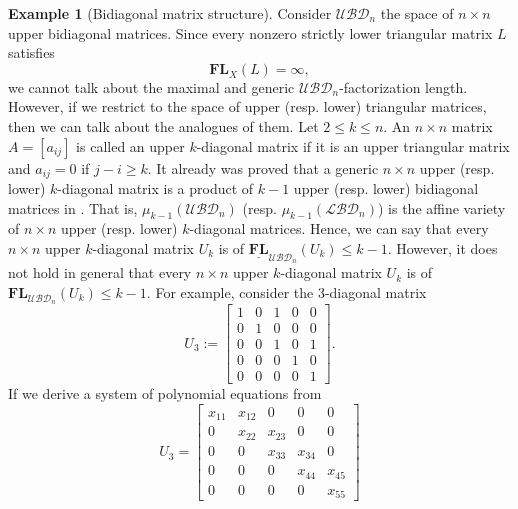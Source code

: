 \documentclass[reqno]{amsart}
\theoremstyle{definition}
\newtheorem{example}[theorem]{Example}
\numberwithin{equation}{section}
\begin{document}
\begin{example}[Bidiagonal matrix structure]\label{ex:bidiagonal}
    Consider $\mathcal{UBD}_n$ the space of $n \times n$ upper bidiagonal matrices. Since every nonzero strictly lower triangular matrix $L$ satisfies
    \begin{equation*}
        \mathbf{FL}_X(L)=\infty,
    \end{equation*}
    we cannot talk about the maximal and generic $\mathcal{UBD}_n$-factorization length. However, if we restrict to the space of upper (resp. lower) triangular matrices, then we can talk about the analogues of them. Let $2 \leq k \leq n$. An $n \times n$ matrix $A=[a_{ij}]$ is called an upper  $k$-diagonal matrix if it is an upper triangular matrix and $a_{ij}=0$ if $j-i\geq k$.
    It already was proved that a generic $n \times n$ upper (resp. lower) $k$-diagonal matrix is a product of $k-1$ upper (resp. lower) bidiagonal matrices in \cite[Lemma 5.1]{ye2017new}. That is, $\mu_{k-1}(\mathcal{UBD}_n)$ (resp. $\mu_{k-1}(\mathcal{LBD}_n)$) is the affine variety of $n \times n$ upper (resp. lower) $k$-diagonal matrices. Hence, we can say that every $n \times n$ upper $k$-diagonal matrix $U_k$ is of $\underline{\mathbf{FL}}_{\mathcal{UBD}_n}(U_k) \leq k-1$. However, it does not hold in general that every $n \times n$ upper $k$-diagonal matrix $U_k$ is of $\mathbf{FL}_{\mathcal{UBD}_n}(U_k)\leq k-1$. For example, consider the $3$-diagonal matrix
    \begin{equation}\label{eq:example of upper triangular matrix}
        U_3:=\begin{bmatrix}
        1 & 0 & 1 & 0 & 0\\
        0 & 1 & 0 & 0 & 0\\
        0 & 0 & 1 & 0 & 1\\
        0 & 0 & 0 & 1 & 0\\
        0 & 0 & 0 & 0 & 1
        \end{bmatrix}.
    \end{equation}
    If we derive a system of polynomial equations from 
    \begin{equation*}
        U_3=\begin{bmatrix}
            x_{11} & x_{12} & 0 & 0 & 0\\
            0 & x_{22} & x_{23} & 0 & 0\\
            0 & 0 & x_{33} & x_{34} & 0\\
            0 & 0 & 0 & x_{44} & x_{45}\\
            0 & 0 & 0 & 0 & x_{55}

\end{bmatrix}
\end{equation*}
\end{example}
\end{document}
